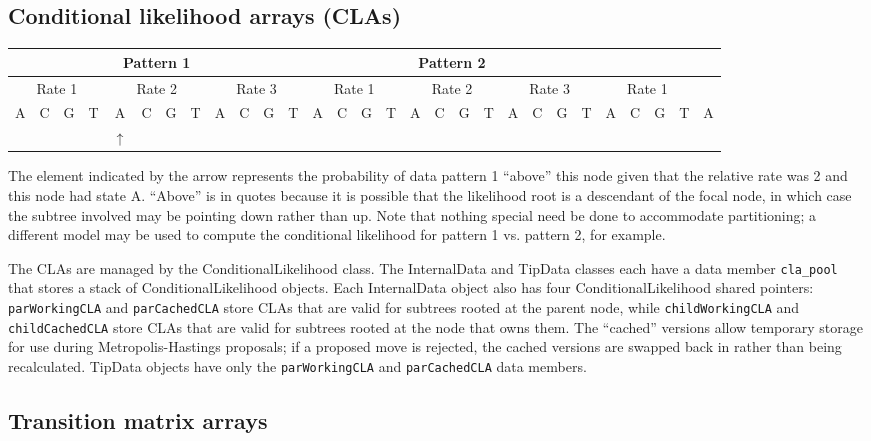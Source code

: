 \subsection{Conditional likelihood arrays (CLAs)}

\resizebox{5.5in}{!} {
\begin{tabular}{|c|c|c|c|c|c|c|c|c|c|c|c|c|c|c|c|c|c|c|c|c|c|c|c|c|c|c|c|c} \hline
\multicolumn{12}{|c|}{Pattern 1} & \multicolumn{12}{c|}{Pattern 2} & \multicolumn{5}{c}{} \\ \hline
\multicolumn{4}{|c|}{Rate 1} & \multicolumn{4}{c|}{Rate 2} &\multicolumn{4}{c|}{Rate 3} &
\multicolumn{4}{c|}{Rate 1} &\multicolumn{4}{c|}{Rate 2} &\multicolumn{4}{c|}{Rate 3} &\multicolumn{4}{c|}{Rate 1} & \\ \hline
A & C & G & T & A & C & G & T & A & C & G & T & A & C & G & T & A & C & G & T & A & C & G & T & A & C & G & T & A \\ \hline
\multicolumn{4}{c}{} & \multicolumn{1}{c}{$\uparrow$} &   \multicolumn{24}{c}{} 
\end{tabular}
}

The element indicated by the arrow represents the probability of data pattern 1 ``above'' this node given that the relative rate was 2 and this node had state A. ``Above'' is in quotes because it is possible that the likelihood root is a descendant of the focal node, in which case the subtree involved may be pointing down rather than up. Note that nothing special need be done to accommodate partitioning; a different model may be used to compute the conditional likelihood for pattern 1 vs. pattern 2, for example.

The CLAs are managed by the ConditionalLikelihood class. The InternalData and TipData classes each have a data member {\tt cla\_pool} that stores a stack of ConditionalLikelihood objects. Each InternalData object also has four ConditionalLikelihood shared pointers: {\tt parWorkingCLA} and {\tt parCachedCLA} store CLAs that are valid for subtrees rooted at the parent node, while {\tt childWorkingCLA} and {\tt childCachedCLA} store CLAs that are valid for subtrees rooted at the node that owns them. The ``cached'' versions allow temporary storage for use during Metropolis-Hastings proposals; if a proposed move is rejected, the cached versions are swapped back in rather than being recalculated. TipData objects have only the {\tt parWorkingCLA} and {\tt parCachedCLA} data members.

\subsection{Transition matrix arrays}

